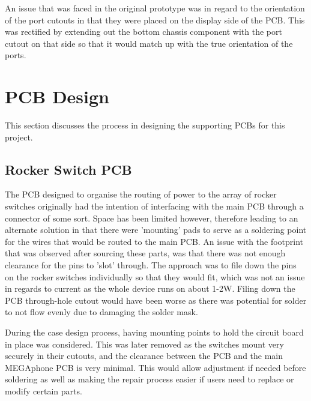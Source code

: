 An issue that was faced in the original prototype was in regard to the orientation of the port cutouts in that they were placed on the display side of the PCB.
This was rectified by extending out the bottom chassis component with the port cutout on that side so that it would match up with the true orientation of the ports. %


\section{PCB Design}
This section discusses the process in designing the supporting PCBs for this project.


\subsection{Rocker Switch PCB}

The PCB designed to organise the routing of power to the array of rocker switches originally had the intention of interfacing with the main PCB through a connector of some sort.
Space has been limited however, therefore leading to an alternate solution in that there were 'mounting' pads to serve as a soldering point for the wires that would be routed to the main PCB.
An issue with the footprint that was observed after sourcing these parts, was that there was not enough clearance for the pins to 'slot' through.
The approach was to file down the pins on the rocker switches individually so that they would fit, which was not an issue in regards to current as the whole device runs on about 1-2W.
Filing down the PCB through-hole cutout would have been worse as there was potential for solder to not flow evenly due to damaging the solder mask. %

During the case design process, having mounting points to hold the circuit board in place was considered.
This was later removed as the switches mount very securely in their cutouts, and the clearance between the PCB and the main MEGAphone PCB is very minimal.
This would allow adjustment if needed before soldering as well as making the repair process easier if users need to replace or modify certain parts.



